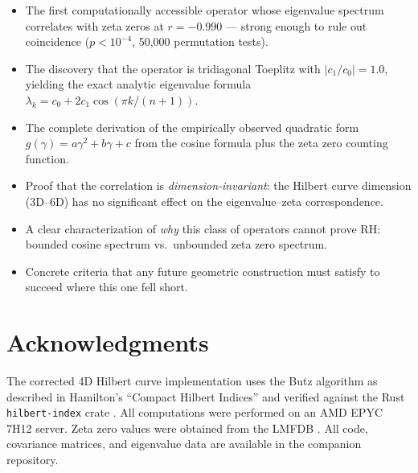 \documentclass[11pt,a4paper]{article}
\begin{document}
\begin{itemize}
\item The first computationally accessible operator whose eigenvalue
   spectrum correlates with zeta zeros at $r = -0.990$ --- strong enough
   to rule out coincidence ($p < 10^{-4}$, 50,000 permutation tests).

\item The discovery that the operator is tridiagonal Toeplitz with
   $|c_1/c_0| = 1.0$, yielding the exact analytic eigenvalue formula
   $\lambda_k = c_0 + 2c_1\cos(\pi k/(n+1))$.

\item The complete derivation of the empirically observed quadratic form
   $g(\gamma) = a\gamma^2 + b\gamma + c$ from the cosine formula plus the
   zeta zero counting function.

\item Proof that the correlation is \emph{dimension-invariant}: the Hilbert
   curve dimension (3D--6D) has no significant effect on the
   eigenvalue--zeta correspondence.

\item A clear characterization of \emph{why} this class of operators cannot
   prove RH: bounded cosine spectrum vs.\ unbounded zeta zero spectrum.

\item Concrete criteria that any future geometric construction must satisfy
   to succeed where this one fell short.
\end{itemize}

\section{Acknowledgments}

The corrected 4D Hilbert curve implementation uses the Butz algorithm as
described in Hamilton's ``Compact Hilbert Indices'' \cite{hamilton2006} and
verified against the Rust \texttt{hilbert-index} crate \cite{hilbert-index}.
All computations were performed on an AMD EPYC 7H12 server. Zeta zero values
were obtained from the LMFDB \cite{lmfdb}. All code, covariance matrices,
and eigenvalue data are available in the companion repository.
\end{document}
